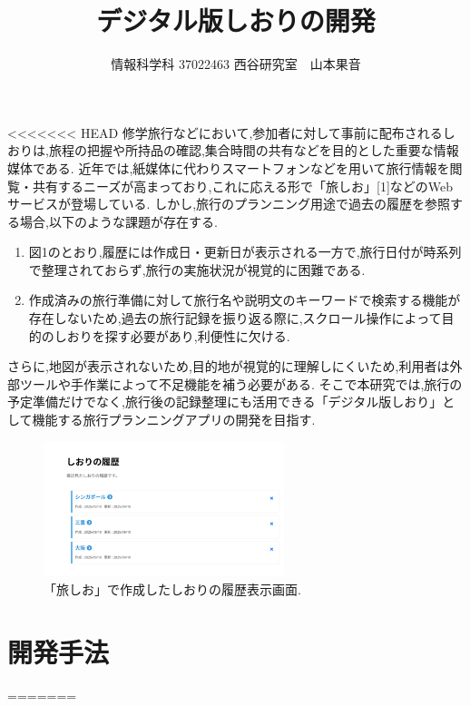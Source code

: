 \documentclass[a4j,twocolumn]{jsarticle}
\begin{document}
  \title{デジタル版しおりの開発}
  \author{情報科学科 \hspace{5mm} 37022463 \hspace{5mm} 西谷研究室　山本果音}
  \date{}

  \maketitle
<<<<<<< HEAD
修学旅行などにおいて,参加者に対して事前に配布されるしおりは,旅程の把握や所持品の確認,集合時間の共有などを目的とした重要な情報媒体である.
近年では,紙媒体に代わりスマートフォンなどを用いて旅行情報を閲覧・共有するニーズが高まっており,これに応える形で「旅しお」[1]などのWebサービスが登場している.
しかし,旅行のプランニング用途で過去の履歴を参照する場合,以下のような課題が存在する.
\begin{enumerate}
\item 図1のとおり,履歴には作成日・更新日が表示される一方で,旅行日付が時系列で整理されておらず,旅行の実施状況が視覚的に困難である.
\item 作成済みの旅行準備に対して旅行名や説明文のキーワードで検索する機能が存在しないため,過去の旅行記録を振り返る際に,スクロール操作によって目的のしおりを探す必要があり,利便性に欠ける.
\end{enumerate}
さらに,地図が表示されないため,目的地が視覚的に理解しにくいため,利用者は外部ツールや手作業によって不足機能を補う必要がある.
そこで本研究では,旅行の予定準備だけでなく,旅行後の記録整理にも活用できる「デジタル版しおり」として機能する旅行プランニングアプリの開発を目指す.



\begin{figure}[htbp]
\centering
\includegraphics[width=7cm]{./figs/rireki1.png}
\caption{\label{fig:org145026f}「旅しお」で作成したしおりの履歴表示画面.}
\end{figure}
\section{開発手法}
\label{sec:orgdda2658}
=======
\end{document}
